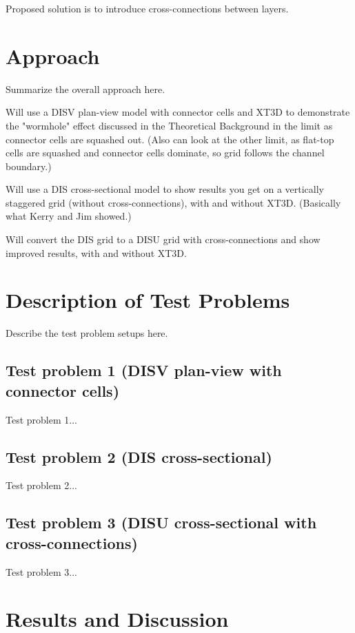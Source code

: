 \documentclass{article}
\begin{document}
Proposed solution is to introduce cross-connections between layers.

\section{Approach}

Summarize the overall approach here.

Will use a DISV plan-view model with connector cells and XT3D to demonstrate the "wormhole" effect discussed in the Theoretical Background in the limit as connector cells are squashed out. (Also can look at the other limit, as flat-top cells are squashed and connector cells dominate, so grid follows the channel boundary.)

Will use a DIS cross-sectional model to show results you get on a vertically staggered grid (without cross-connections), with and without XT3D.  (Basically what Kerry and Jim showed.)

Will convert the DIS grid to a DISU grid with cross-connections and show improved results, with and without XT3D.

\section{Description of Test Problems}

Describe the test problem setups here.

\subsection{Test problem 1 (DISV plan-view with connector cells)}

Test problem 1...

\subsection{Test problem 2 (DIS cross-sectional)}

Test problem 2...

\subsection{Test problem 3 (DISU cross-sectional with cross-connections)}

Test problem 3...

\section{Results and Discussion}
\end{document}
